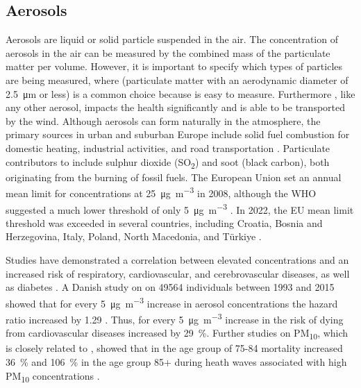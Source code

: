 \subsection{Aerosols}
Aerosols are liquid or solid particle suspended in the air. The concentration of aerosols in the air can be measured by the combined mass of the particulate matter per volume. However, it is important to specify which types of particles are being measured, where \PM(particulate matter with an aerodynamic diameter of \SI{2.5}{\micro\meter} or less) is a common choice because \PM is easy to measure. Furthermore \PM, like any other aerosol, impacts the health significantly and is able to be transported by the wind. Although aerosols can form naturally in the atmosphere, the primary sources in urban and suburban Europe include solid fuel combustion for domestic heating, industrial activities, and road transportation \cite{europeanenvironmentagencyEuropesAirQuality2024}. Particulate contributors to \PM include sulphur dioxide (SO\textsubscript{2}) and soot (black carbon), both originating from the burning of fossil fuels. The European Union set an annual mean limit for \PM concentrations at \SI{25}{\micro\gram\per\cubic\meter} in 2008, although the WHO suggested a much lower threshold of only \SI{5}{\micro\gram\per\cubic\meter} \cite{europeanenvironmentagencyEuropesAirQuality2024}. In 2022, the EU mean limit threshold was exceeded in several countries, including Croatia, Bosnia and Herzegovina, Italy, Poland, North Macedonia, and Türkiye \cite{europeanenvironmentagencyEuropesAirQuality2024}. 

Studies have demonstrated a correlation between elevated \PM concentrations and an increased risk of respiratory, cardiovascular, and cerebrovascular diseases, as well as diabetes \cite{sharmaHealthEffectsAssociated2020}. A Danish study on on \SI{49564}{} individuals between 1993 and 2015 showed that for every \SI{5}{\micro\gram\per
\m\cubed} increase in aerosol concentrations the hazard ratio increased by 1.29 \cite{hvidtfeldtLongtermResidentialExposure2019}. Thus, for every \SI{5}{\micro\gram\per
\m\cubed} increase in \PM the risk of dying from cardiovascular diseases increased by \SI{29}{\%}. Further studies on PM\textsubscript{10}, which is closely related to \PM, showed that in the age group of 75-84 mortality increased \SI{36}{\%} and \SI{106}{\%} in the age group 85+ during heath waves associated with high PM\textsubscript{10} concentrations \cite{analitisEffectsHeatWaves2014}.  


